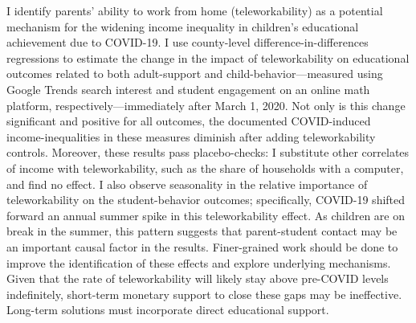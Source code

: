 I identify parents' ability to work from home (teleworkability) as a potential mechanism for the widening income inequality in children's educational achievement due to COVID-19.
I use county-level difference-in-differences regressions to estimate the change in the impact of teleworkability on educational outcomes related to both adult-support and child-behavior---measured using Google Trends search interest and student engagement on an online math platform, respectively---immediately after March 1, 2020.
Not only is this change significant and positive for all outcomes, the documented COVID-induced income-inequalities in these measures diminish after adding teleworkability controls.
Moreover, these results pass placebo-checks: I substitute other correlates of income with teleworkability, such as the share of households with a computer, and find no effect.
I also observe seasonality in the relative importance of teleworkability on the student-behavior outcomes; specifically, COVID-19 shifted forward an annual summer spike in this teleworkability effect.
As children are on break in the summer, this pattern suggests that parent-student contact may be an important causal factor in the results.
Finer-grained work should be done to improve the identification of these effects and explore underlying mechanisms.
Given that the rate of teleworkability will likely stay above pre-COVID levels indefinitely, short-term monetary support to close these gaps may be ineffective.
Long-term solutions must incorporate direct educational support.
